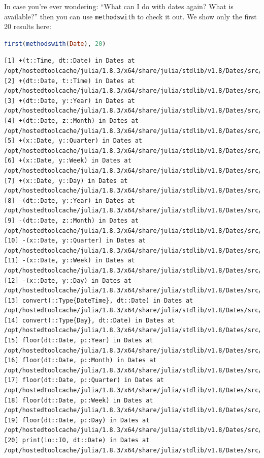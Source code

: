 \documentclass[
  notoc %
]{tufte-book}
\newcommand{\passthrough}[1]{#1}
\begin{document}
In case you're ever wondering: ``What can I do with dates again? What is
available?'' then you can use \passthrough{\lstinline!methodswith!} to
check it out. We show only the first 20 results here:

\begin{lstlisting}[language=Julia]
first(methodswith(Date), 20)
\end{lstlisting}

\begin{lstlisting}[language=Output]
[1] +(t::Time, dt::Date) in Dates at /opt/hostedtoolcache/julia/1.8.3/x64/share/julia/stdlib/v1.8/Dates/src/arithmetic.jl:20
[2] +(dt::Date, t::Time) in Dates at /opt/hostedtoolcache/julia/1.8.3/x64/share/julia/stdlib/v1.8/Dates/src/arithmetic.jl:19
[3] +(dt::Date, y::Year) in Dates at /opt/hostedtoolcache/julia/1.8.3/x64/share/julia/stdlib/v1.8/Dates/src/arithmetic.jl:27
[4] +(dt::Date, z::Month) in Dates at /opt/hostedtoolcache/julia/1.8.3/x64/share/julia/stdlib/v1.8/Dates/src/arithmetic.jl:54
[5] +(x::Date, y::Quarter) in Dates at /opt/hostedtoolcache/julia/1.8.3/x64/share/julia/stdlib/v1.8/Dates/src/arithmetic.jl:73
[6] +(x::Date, y::Week) in Dates at /opt/hostedtoolcache/julia/1.8.3/x64/share/julia/stdlib/v1.8/Dates/src/arithmetic.jl:77
[7] +(x::Date, y::Day) in Dates at /opt/hostedtoolcache/julia/1.8.3/x64/share/julia/stdlib/v1.8/Dates/src/arithmetic.jl:79
[8] -(dt::Date, y::Year) in Dates at /opt/hostedtoolcache/julia/1.8.3/x64/share/julia/stdlib/v1.8/Dates/src/arithmetic.jl:35
[9] -(dt::Date, z::Month) in Dates at /opt/hostedtoolcache/julia/1.8.3/x64/share/julia/stdlib/v1.8/Dates/src/arithmetic.jl:66
[10] -(x::Date, y::Quarter) in Dates at /opt/hostedtoolcache/julia/1.8.3/x64/share/julia/stdlib/v1.8/Dates/src/arithmetic.jl:74
[11] -(x::Date, y::Week) in Dates at /opt/hostedtoolcache/julia/1.8.3/x64/share/julia/stdlib/v1.8/Dates/src/arithmetic.jl:78
[12] -(x::Date, y::Day) in Dates at /opt/hostedtoolcache/julia/1.8.3/x64/share/julia/stdlib/v1.8/Dates/src/arithmetic.jl:80
[13] convert(::Type{DateTime}, dt::Date) in Dates at /opt/hostedtoolcache/julia/1.8.3/x64/share/julia/stdlib/v1.8/Dates/src/conversions.jl:30
[14] convert(::Type{Day}, dt::Date) in Dates at /opt/hostedtoolcache/julia/1.8.3/x64/share/julia/stdlib/v1.8/Dates/src/conversions.jl:37
[15] floor(dt::Date, p::Year) in Dates at /opt/hostedtoolcache/julia/1.8.3/x64/share/julia/stdlib/v1.8/Dates/src/rounding.jl:45
[16] floor(dt::Date, p::Month) in Dates at /opt/hostedtoolcache/julia/1.8.3/x64/share/julia/stdlib/v1.8/Dates/src/rounding.jl:51
[17] floor(dt::Date, p::Quarter) in Dates at /opt/hostedtoolcache/julia/1.8.3/x64/share/julia/stdlib/v1.8/Dates/src/rounding.jl:61
[18] floor(dt::Date, p::Week) in Dates at /opt/hostedtoolcache/julia/1.8.3/x64/share/julia/stdlib/v1.8/Dates/src/rounding.jl:66
[19] floor(dt::Date, p::Day) in Dates at /opt/hostedtoolcache/julia/1.8.3/x64/share/julia/stdlib/v1.8/Dates/src/rounding.jl:73
[20] print(io::IO, dt::Date) in Dates at /opt/hostedtoolcache/julia/1.8.3/x64/share/julia/stdlib/v1.8/Dates/src/io.jl:722
\end{lstlisting}
\end{document}
